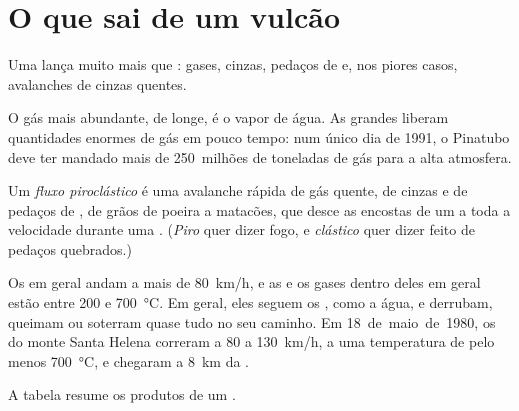 \section{O que sai de um vulcão}

Uma  lança muito mais que : gases, cinzas, pedaços de  e,
nos piores casos, avalanches de cinzas quentes.

O gás mais abundante, de longe, é o vapor de água. As grandes 
liberam quantidades enormes de gás em pouco tempo: num único dia de 1991,
o Pinatubo deve ter mandado mais de 250~milhões de toneladas de gás para a
alta atmosfera.

\begin{definition}\label{def:g7:volcanoes:pyroclastic-flow}
Um \emph{fluxo piroclástico} é uma avalanche rápida de
gás quente, de cinzas e de pedaços de , de grãos de poeira a
matacões, que desce as encostas de um  a toda a velocidade durante
uma . (\emph{Piro} quer dizer fogo, e \emph{clástico}
quer dizer feito de pedaços quebrados.)
\end{definition}

Os  em geral andam a mais de \qty{80}{km/h}, e as
 e os gases dentro deles em geral estão entre 200 e
\qty{700}{\degreeCelsius}. Em geral, eles seguem os , como a água, e derrubam, queimam ou
soterram quase tudo no seu caminho. Em 18~de~maio~de~1980, os  do monte Santa Helena correram a 80 a \qty{130}{km/h}, a uma
temperatura de pelo menos \qty{700}{\degreeCelsius}, e chegaram a
\qty{8}{km} da .

A tabela resume os produtos de um .

